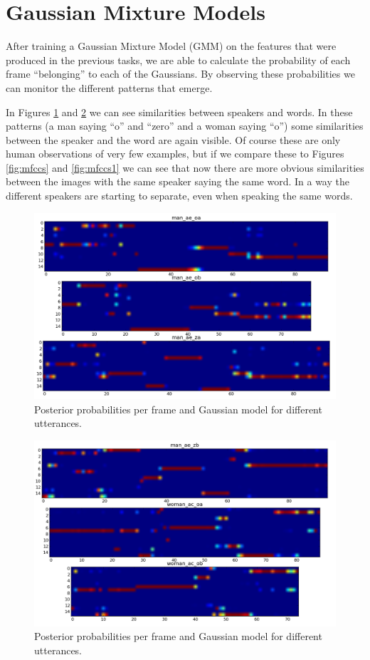 \documentclass[12pt,a4paper,oneside]{article}
\begin{document}
\section{Gaussian Mixture Models}
After training a Gaussian Mixture Model (GMM) on the features that were produced in the previous tasks, we are able to calculate the probability of each frame ``belonging'' to each of the Gaussians. By observing these probabilities we can monitor the different patterns that emerge.

In Figures \ref{fig:probs} and \ref{fig:probs1} we can see similarities between speakers and words. In these patterns (a man saying ``o'' and ``zero'' and a woman saying ``o'') some similarities between the speaker and the word are again visible. Of course these are only human observations of very few examples, but if we compare these to Figures \ref{fig:mfccs} and \ref{fig:mfccs1} we can see that now there are more obvious similarities between the images with the same speaker saying the same word. In a way the different speakers are starting to separate, even when speaking the same words.


\begin{figure}
\centering
\includegraphics[scale=0.5]{../probs.png}
\caption{Posterior probabilities per frame and Gaussian model for different utterances.}
\label{fig:probs}
\end{figure}

\begin{figure}
\centering
\includegraphics[scale=0.5]{../probs1.png}
\caption{Posterior probabilities per frame and Gaussian model for different utterances.}
\label{fig:probs1}
\end{figure}
\end{document}

